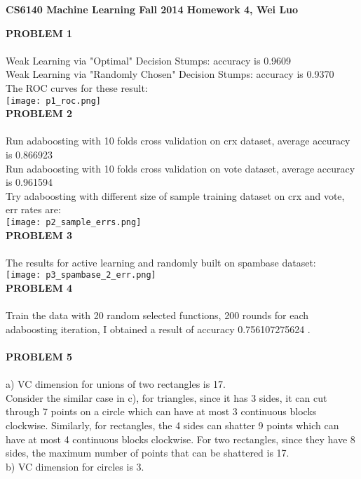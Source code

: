 \documentclass[11pt,a4paper,fleqn]{article}
\begin{document}
\begin{center}
\textbf{CS6140 Machine Learning Fall 2014 Homework 4, Wei Luo }\\
\end{center}
\textbf{PROBLEM 1}\\
\\
Weak Learning via "Optimal" Decision Stumps: accuracy is 0.9609\\
Weak Learning via "Randomly Chosen" Decision Stumps: accuracy is 0.9370\\
The ROC curves for these result:\\
\texttt{[image: p1\_roc.png]}\\
\textbf{PROBLEM 2}\\
\\
Run adaboosting with 10 folds cross validation on crx dataset, average accuracy is 0.866923\\
Run adaboosting with 10 folds cross validation on vote dataset, average accuracy is 0.961594\\
Try adaboosting with different size of sample training dataset on crx and vote, err rates are:\\
\texttt{[image: p2\_sample\_errs.png]}\\
\newpage \noindent
\textbf{PROBLEM 3}\\
\\
The results for active learning and randomly built on spambase dataset:\\
\texttt{[image: p3\_spambase\_2\_err.png]}\\
\textbf{PROBLEM 4}\\
\\
Train the data with 20 random selected functions, 200 rounds for each adaboosting iteration, I obtained a result of accuracy 0.756107275624 .\\
\\
\textbf{PROBLEM 5}\\
\\
a) VC dimension for unions of two rectangles is 17.\\
Consider the similar case in c), for triangles, since it has 3 sides, it can cut through 7 points on a circle which can have at most 3 continuous blocks clockwise. Similarly, for rectangles, the 4 sides can shatter 9 points which can have at most 4 continuous blocks clockwise. For two rectangles, since they have 8 sides, the maximum number of points that can be shattered is 17.\\
b) VC dimension for circles is 3.\\
\end{document}
